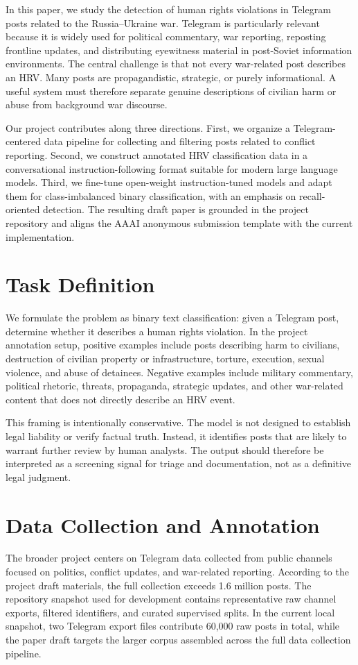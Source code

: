 \documentclass[letterpaper]{article}
\begin{document}
In this paper, we study the detection of human rights violations in Telegram posts related to the Russia--Ukraine war. Telegram is particularly relevant because it is widely used for political commentary, war reporting, reposting frontline updates, and distributing eyewitness material in post-Soviet information environments. The central challenge is that not every war-related post describes an HRV. Many posts are propagandistic, strategic, or purely informational. A useful system must therefore separate genuine descriptions of civilian harm or abuse from background war discourse.

Our project contributes along three directions. First, we organize a Telegram-centered data pipeline for collecting and filtering posts related to conflict reporting. Second, we construct annotated HRV classification data in a conversational instruction-following format suitable for modern large language models. Third, we fine-tune open-weight instruction-tuned models and adapt them for class-imbalanced binary classification, with an emphasis on recall-oriented detection. The resulting draft paper is grounded in the project repository and aligns the AAAI anonymous submission template with the current implementation.

\section{Task Definition}
We formulate the problem as binary text classification: given a Telegram post, determine whether it describes a human rights violation. In the project annotation setup, positive examples include posts describing harm to civilians, destruction of civilian property or infrastructure, torture, execution, sexual violence, and abuse of detainees. Negative examples include military commentary, political rhetoric, threats, propaganda, strategic updates, and other war-related content that does not directly describe an HRV event.

This framing is intentionally conservative. The model is not designed to establish legal liability or verify factual truth. Instead, it identifies posts that are likely to warrant further review by human analysts. The output should therefore be interpreted as a screening signal for triage and documentation, not as a definitive legal judgment.

\section{Data Collection and Annotation}
The broader project centers on Telegram data collected from public channels focused on politics, conflict updates, and war-related reporting. According to the project draft materials, the full collection exceeds 1.6 million posts. The repository snapshot used for development contains representative raw channel exports, filtered identifiers, and curated supervised splits. In the current local snapshot, two Telegram export files contribute 60{,}000 raw posts in total, while the paper draft targets the larger corpus assembled across the full data collection pipeline.
\end{document}
